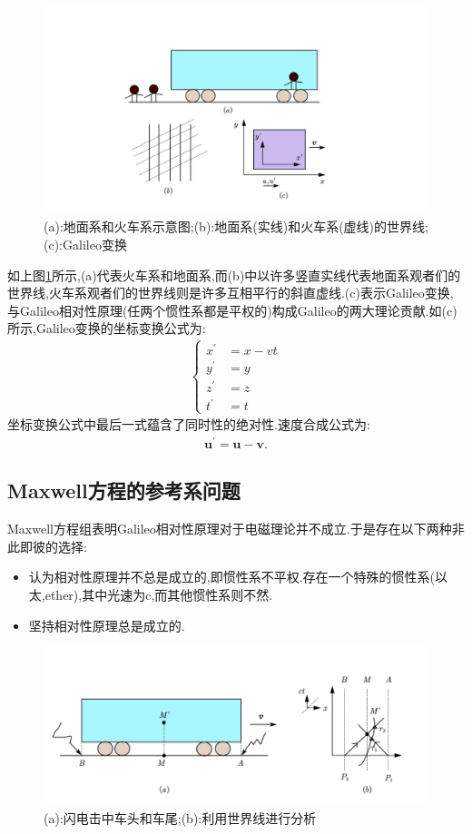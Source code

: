 \begin{figure}[htbp]
    \centering
 \includegraphics[width=1.2\textwidth]{img/6-2.png}
    \caption{(a):地面系和火车系示意图;(b):地面系(实线)和火车系(虚线)的世界线;(c):Galileo变换}
    \label{fig:6-2}
\end{figure}

如上图\ref{fig:6-2}所示,(a)代表火车系和地面系,而(b)中以许多竖直实线代表地面系观者们的世界线,火车系观者们的世界线则是许多互相平行的斜直虚线.(c)表示Galileo变换,与Galileo相对性原理(任两个惯性系都是平权的)构成Galileo的两大理论贡献.如(c)所示,Galileo变换的坐标变换公式为:
\begin{align}
    \left\{
    \begin{aligned}
        x^\prime&=x-vt\\
        y^\prime&=y\\
        z^\prime&=z\\
        t^\prime&=t
    \end{aligned}
    \right.
\end{align}
坐标变换公式中最后一式蕴含了同时性的绝对性.速度合成公式为:
\begin{align}
    \boldsymbol{u}^\prime=\boldsymbol{u}-\boldsymbol{v}.
\end{align}
\subsection{Maxwell方程的参考系问题}
Maxwell方程组表明Galileo相对性原理对于电磁理论并不成立.于是存在以下两种非此即彼的选择:
\begin{itemize}
\item 认为相对性原理并不总是成立的,即惯性系不平权.存在一个特殊的惯性系(以太,ether),其中光速为c,而其他惯性系则不然.
\item 坚持相对性原理总是成立的.
\end{itemize}

\begin{figure}[htbp]
    \centering
 \includegraphics[width=\textwidth]{img/6-3.png}
    \caption{(a):闪电击中车头和车尾;(b):利用世界线进行分析}
    \label{fig:6-3}
\end{figure}